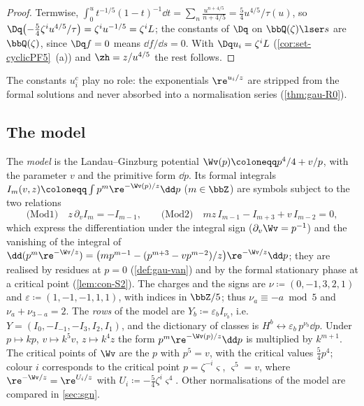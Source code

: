 \begin{proof}
Termwise, $\int_0^ut^{-1/5}(1-t)^{-1}\dd t=\sum_n\frac{u^{n+4/5}}{n+4/5}=\frac54u^{4/5}/\tau(u)$, so $\Dq\bigl(-\frac54\zeta^iu^{4/5}/\tau\bigr)=\zeta^iu^{-1/5}=\zeta^iL$; the constants of $\Dq$ on $\bbQ(\zeta)\lser s$ are $\bbQ(\zeta)$, since $\Dq f=0$ means $\dd f/\dd s=0$. With $\Dq u_i=\zeta^iL$ (\cref{cor:set-cyclicPF5}~(a)) and $\zh=z/u^{4/5}$ the rest follows.
\end{proof}

The constants $u_i^{\mathrm c}$ play no role: the exponentials $\re^{u_i/z}$ are stripped from the formal solutions and never absorbed into a normalisation series (\cref{thm:gau-R0}).

\subsection{The model}
\label{sec:set-model}

\begin{defn}
\label{def:set-model}
The \emph{model} is the Landau--Ginzburg potential $\Wv(p)\coloneqq p^4/4+v/p$, with the parameter $v$ and the primitive form $\dd p$. Its formal integrals $I_m(v,z)\coloneqq\int p^m\re^{-\Wv(p)/z}\dd p$ ($m\in\bbZ$) are symbols subject to the two relations
\[
\text{(Mod1)}\quad z\,\partial_vI_m=-I_{m-1},\qquad\text{(Mod2)}\quad mz\,I_{m-1}-I_{m+3}+v\,I_{m-2}=0,
\]
which express the differentiation under the integral sign ($\partial_v\Wv=p^{-1}$) and the vanishing of the integral of $\dd(p^m\re^{-\Wv/z})=\bigl(mp^{m-1}-(p^{m+3}-vp^{m-2})/z\bigr)\re^{-\Wv/z}\dd p$; they are realised by residues at $p=0$ (\cref{def:gau-van}) and by the formal stationary phase at a critical point (\cref{lem:con-S2}). The charges and the signs are $\nu\coloneqq(0,-1,3,2,1)$ and $\varepsilon\coloneqq(1,-1,-1,1,1)$, with indices in $\bbZ/5$; thus $\nu_a\equiv-a\bmod5$ and $\nu_a+\nu_{3-a}=2$. The \emph{rows} of the model are $Y_b\coloneqq\varepsilon_bI_{\nu_b}$, i.e.\ $Y=(I_0,-I_{-1},-I_3,I_2,I_1)$, and the dictionary of classes is $H^b\leftrightarrow\varepsilon_b\,p^{\nu_b}\dd p$. Under $p\mapsto kp$, $v\mapsto k^5v$, $z\mapsto k^4z$ the form $p^m\re^{-\Wv(p)/z}\dd p$ is multiplied by $k^{m+1}$. The critical points of $\Wv$ are the $p$ with $p^5=v$, with the critical values $\frac54p^4$; colour $i$ corresponds to the critical point $p=\zeta^{-i}\varsigma$, $\varsigma^5=v$, where $\re^{-\Wv/z}=\re^{U_i/z}$ with $U_i\coloneqq-\frac54\zeta^i\varsigma^4$. Other normalisations of the model are compared in \cref{sec:sgn}.
\end{defn}

